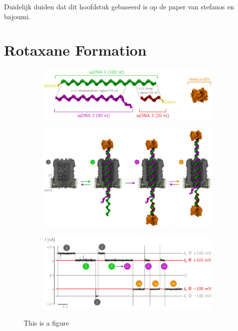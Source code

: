 Duidelijk duiden dat dit hoofdstuk gebaseerd is op de paper van stefanos en bajoumi.
\section{Rotaxane Formation}



\begin{figure}[ht]
  \begin{centering}
  \begin{subfigure}[t]{\dimexpr.5\linewidth-1.3em\relax}
  \centering
  \includegraphics[width=.9\linewidth,valign=t]{Figures/RConstruction1.png}
  \end{subfigure}%
  \vspace{1cm}
  \begin{subfigure}[t]{\dimexpr.5\linewidth-1.3em\relax}
  \centering
  \includegraphics[width=.9\linewidth,valign=t]{Figures/RConstruction2.png}
  \end{subfigure}%
  \vspace{1cm}
  \begin{subfigure}[t]{\dimexpr.5\linewidth-1.3em\relax}
  \centering
  \includegraphics[width=.9\linewidth,valign=t]{Figures/RConstruction3.png}
  \end{subfigure}
  \caption{This is a figure}
  \label{fig:test}
  \end{centering}
\end{figure}

